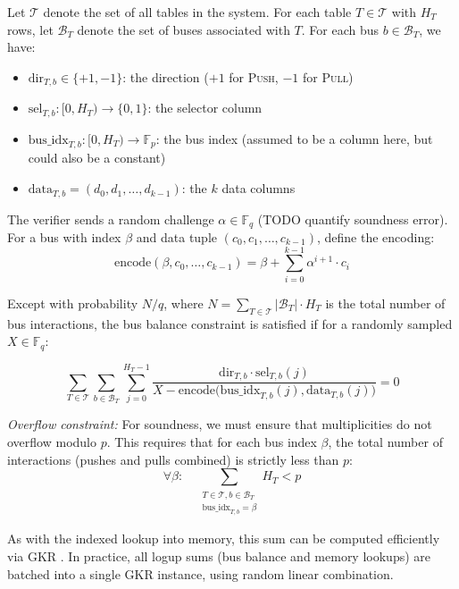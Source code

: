 \documentclass{article}
\theoremstyle{definition}
\newcommand{\Fp}{\mathbb F_p}
\newcommand{\Fq}{\mathbb F_q}
\begin{document}
Let $\mathcal{T}$ denote the set of all tables in the system. For each table $T \in \mathcal{T}$ with $H_T$ rows, let $\mathcal{B}_T$ denote the set of buses associated with $T$. For each bus $b \in \mathcal{B}_T$, we have:
\begin{itemize}
    \item $\text{dir}_{T,b} \in \{+1, -1\}$: the direction ($+1$ for \textsc{Push}, $-1$ for \textsc{Pull})
    \item $\text{sel}_{T,b}: [0, H_T) \to \{0, 1\}$: the selector column
    \item $\text{bus\_idx}_{T,b}: [0, H_T) \to \Fp$: the bus index (assumed to be a column here, but could also be a constant)
    \item $\text{data}_{T,b} = (d_0, d_1, \ldots, d_{k-1})$: the $k$ data columns
\end{itemize}

\vspace{3mm}

The verifier sends a random challenge $\alpha \in \Fq$ (TODO quantify soundness error). For a bus with index $\beta$ and data tuple $(c_0, c_1, \ldots, c_{k-1})$, define the encoding:
$$\text{encode}(\beta, c_0, \ldots, c_{k-1}) = \beta + \sum_{i=0}^{k-1} \alpha^{i+1} \cdot c_i$$

\vspace{3mm}

Except with probability $N/q$, where $N = \sum_{T \in \mathcal{T}} |\mathcal{B}_T| \cdot H_T$ is the total number of bus interactions, the bus balance constraint is satisfied if for a randomly sampled $X \in \Fq$:

$$\sum_{T \in \mathcal{T}} \sum_{b \in \mathcal{B}_T} \sum_{j=0}^{H_T - 1} \frac{\text{dir}_{T,b} \cdot \text{sel}_{T,b}(j)}{X - \text{encode}\big(\text{bus\_idx}_{T,b}(j), \text{data}_{T,b}(j)\big)} = 0$$


\vspace{3mm}

\textit{Overflow constraint:} For soundness, we must ensure that multiplicities do not overflow modulo $p$. This requires that for each bus index $\beta$, the total number of interactions (pushes and pulls combined) is strictly less than $p$:
$$\forall \beta: \quad \sum_{\substack{T \in \mathcal{T}, b \in \mathcal{B}_T \\ \text{bus\_idx}_{T,b} = \beta}} H_T < p$$

\vspace{3mm}

As with the indexed lookup into memory, this sum can be computed efficiently via GKR \cite{logup_gkr}. In practice, all logup sums (bus balance and memory lookups) are batched into a single GKR instance, using random linear combination.
\end{document}
